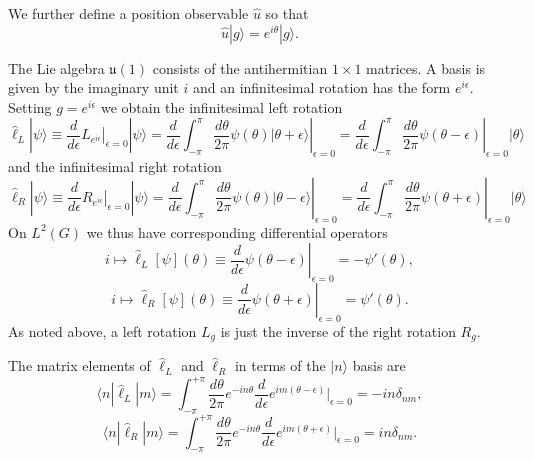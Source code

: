 \documentclass[12pt]{amsart}
\def\lauone{\mathfrak{u}(1)}
\theoremstyle{definition}
\theoremstyle{remark}
\numberwithin{equation}{section}
\begin{document}
We further define a position observable $\widehat{u}$ so that
\begin{equation}
  \widehat{u}|g\rangle = e^{i\theta} |g\rangle.
\end{equation}

The Lie algebra $\lauone$ consists of the antihermitian $1 \times 1$ matrices.
A basis is given by the imaginary unit $i$ and an infinitesimal rotation has the 
form $e^{i\epsilon}$. Setting $g = e^{i\epsilon}$ we obtain the 
infinitesimal left rotation
\begin{equation}
  \widehat{\ell}_L |\psi\rangle \equiv \frac{d}{d\epsilon} \left. L_{e^{i\epsilon}} \right|_{\epsilon = 0} |\psi\rangle
    = \frac{d}{d\epsilon} \int_{-\pi}^{\pi} \left. \frac{d\theta}{2\pi} \psi(\theta) |\theta + \epsilon\rangle \right|_{\epsilon = 0}
    = \frac{d}{d\epsilon} \int_{-\pi}^{\pi} \left. \frac{d\theta}{2\pi} \psi(\theta - \epsilon) \right|_{\epsilon = 0} |\theta\rangle
\end{equation}
and the infinitesimal right rotation
\begin{equation}
  \widehat{\ell}_R |\psi\rangle \equiv \frac{d}{d\epsilon} \left. R_{e^{i\epsilon}} \right|_{\epsilon = 0} |\psi\rangle
    = \frac{d}{d\epsilon} \left. \int_{-\pi}^{\pi} \frac{d\theta}{2\pi} \psi(\theta) |\theta - \epsilon\rangle \right|_{\epsilon = 0}
    = \frac{d}{d\epsilon} \left. \int_{-\pi}^{\pi} \frac{d\theta}{2\pi} \psi(\theta + \epsilon) \right|_{\epsilon = 0} |\theta\rangle
\end{equation}
On $L^2(G)$ we thus have corresponding differential operators
\begin{equation}
  i \mapsto \widehat{\ell}_L[\psi](\theta) \equiv \left. \frac{d}{d\epsilon} \psi(\theta - \epsilon) \right|_{\epsilon = 0}
    = - \psi'(\theta),
\end{equation}
\begin{equation}
  i \mapsto \widehat{\ell}_R[\psi](\theta) \equiv \left. \frac{d}{d\epsilon} \psi(\theta + \epsilon) \right|_{\epsilon = 0}
    = \psi'(\theta).
\end{equation}
As noted above, a left rotation $L_g$ is just the inverse
of the right rotation $R_g$.

The matrix elements of $\widehat{\ell}_L$ and $\widehat{\ell}_R$
in terms of the $|n\rangle$ basis are
\begin{equation}
  \langle n|\widehat{\ell}_L |m\rangle = \int_{-\pi}^{+\pi} \frac{d\theta}{2\pi}
    e^{-in\theta} \frac{d}{d\epsilon} e^{im(\theta - \epsilon)} \bigg|_{\epsilon = 0}
    = -in\delta_{nm},
\end{equation}
\begin{equation}
  \langle n|\widehat{\ell}_R |m\rangle = \int_{-\pi}^{+\pi} \frac{d\theta}{2\pi}
    e^{-in\theta} \frac{d}{d\epsilon} e^{im(\theta + \epsilon)} \bigg|_{\epsilon = 0}
    = in\delta_{nm}.
\end{equation}
\end{document}
